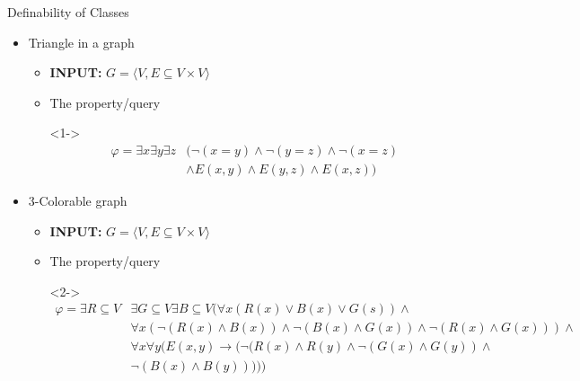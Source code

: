 \documentclass[usenames,dvipsnames]{beamer}
\newcommand\ldiaarg[1]{\langle#1\rangle}
\begin{document}
\begin{frame}{Definability of Classes}
    \begin{itemize}
        \item<1-> Triangle in a graph
        \begin{itemize}
            \item<1-> \textbf{INPUT:} $G = \ldiaarg{V, E\subseteq V\times V}$
            \item<1-> The property/query
            \item[]<1->
            \begin{align*}
            \varphi =  \exists x\exists y\exists z &(\neg(x=y)\wedge\neg(y=z)\wedge\neg(x=z)\\
                                                    &\wedge E(x,y)\wedge E(y,z)\wedge E(x,z))
            \end{align*}
        \end{itemize}

        \item<2-> 3-Colorable graph
        \begin{itemize}
            \item<2-> \textbf{INPUT:} $G = \ldiaarg{V, E\subseteq V\times V}$
            \item<2-> The property/query
            \item[]<2->
            \begin{align*}
            \varphi =  \exists R\subseteq V&\exists G\subseteq V\exists B\subseteq V (\forall x (R(x)\vee B(x)\vee G(s))\wedge\\
                                            &\forall x (\neg (R(x)\wedge B(x))\wedge\neg(B(x)\wedge G(x))\wedge\neg(R(x)\wedge G(x)))\wedge\\
                                            &\forall x\forall y(E(x,y)\rightarrow(\neg(R(x)\wedge R(y)\wedge\neg(G(x)\wedge G(y))\wedge\\
                                                                                    &\neg(B(x)\wedge B(y)))))
            \end{align*}
        \end{itemize}
    \end{itemize}
\end{frame}
\end{document}
